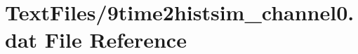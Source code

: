 \hypertarget{9time2histsim__channel0_8dat}{}\section{Text\+Files/9time2histsim\+\_\+channel0.dat File Reference}
\label{9time2histsim__channel0_8dat}
